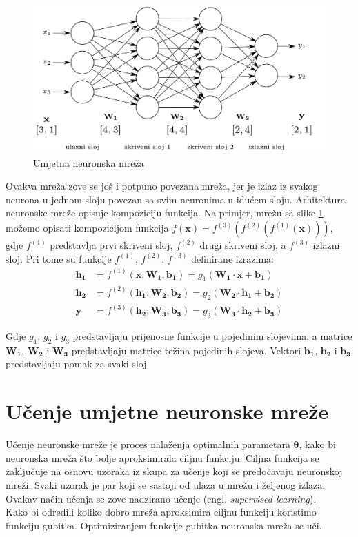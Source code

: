 \documentclass[times, utf8, zavrsni, numeric]{fer}
\renewcommand{\vec}[1]{\mathbf{#1}}
\begin{document}
\begin{figure}[htb]
	\centering
	\includegraphics[scale=0.65]{ann.pdf}
	\caption{Umjetna neuronska mreža}
	\label{fig:ann}
\end{figure}

Ovakva mreža zove se još i 
potpuno povezana mreža, jer je izlaz iz svakog neurona u jednom sloju povezan 
sa svim neuronima u idućem sloju. Arhitektura neuronske mreže opisuje
kompoziciju funkcija. Na primjer, mrežu sa slike \ref{fig:ann} možemo opisati 
kompozicijom funkcija $f(\vec{x}) = f^{(3)}(f^{(2)}(f^{(1)}(\vec{x})))$, gdje
$f^{(1)}$ predstavlja prvi skriveni sloj, $f^{(2)}$ drugi skriveni sloj, a
$f^{(3)}$ izlazni sloj. Pri tome su funkcije $f^{(1)}$, $f^{(2)}$, $f^{(3)}$
definirane izrazima: 
\begin{align}
	\vec{h_1} &= f^{(1)}(\vec{x};\vec{W_1}, \vec{b_1}) = g_1(\vec{W_1}\cdot
	\vec{x} +\vec{b_1}) \\
	\vec{h_2} &= f^{(2)}(\vec{h_1};\vec{W_2}, \vec{b_2})= g_2(\vec{W_2}\cdot
	\vec{h_1} +\vec{b_2}) \\
	\vec{y} &= f^{(3)}(\vec{h_2};\vec{W_3}, \vec{b_3}) = g_3(\vec{W_3}\cdot
	\vec{h_2} +\vec{b_3})
\end{align}

Gdje $g_1$, $g_2$ i $g_3$ predstavljaju prijenosne funkcije u pojedinim 
slojevima, a matrice $\vec{W_1}$, $\vec{W_2}$ i $\vec{W_3}$ predstavljaju
matrice težina pojedinih slojeva. Vektori $\vec{b_1}$, $\vec{b_2}$ i $\vec{b_3}$
predstavljaju pomak za svaki sloj.

\section{Učenje umjetne neuronske mreže}
Učenje neuronske mreže je proces nalaženja optimalnih parametara $\pmb{\theta}$,
kako bi neuronska mreža što bolje aproksimirala ciljnu funkciju. Ciljna funkcija
se zaključuje na osnovu uzoraka iz skupa za učenje koji se predočavaju 
neuronskoj mreži. Svaki uzorak je par koji se sastoji od ulaza u mrežu i
željenog izlaza. Ovakav način učenja se zove nadzirano učenje (engl. 
\textit{supervised learning}).
\\\indent
Kako bi odredili koliko dobro mreža aproksimira ciljnu funkciju koristimo
funkciju gubitka. Optimiziranjem funkcije gubitka neuronska mreža se uči.
\end{document}
